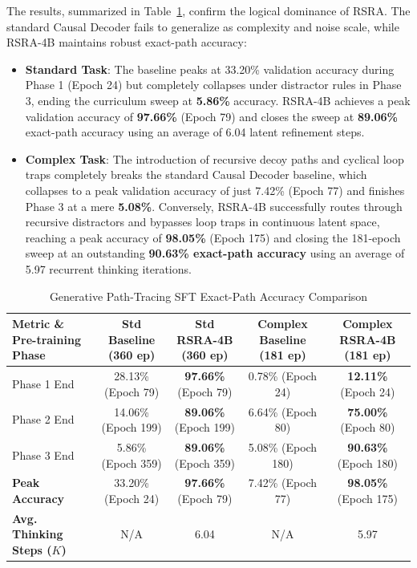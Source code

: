 \documentclass[11pt,a4paper]{article}
\theoremstyle{definition}
\begin{document}
The results, summarized in Table~\ref{tab:generative_results}, confirm the logical dominance of RSRA. The standard Causal Decoder fails to generalize as complexity and noise scale, while RSRA-4B maintains robust exact-path accuracy:
\begin{itemize}
    \item \textbf{Standard Task}: The baseline peaks at 33.20\% validation accuracy during Phase 1 (Epoch 24) but completely collapses under distractor rules in Phase 3, ending the curriculum sweep at \textbf{5.86\%} accuracy. RSRA-4B achieves a peak validation accuracy of \textbf{97.66\%} (Epoch 79) and closes the sweep at \textbf{89.06\%} exact-path accuracy using an average of 6.04 latent refinement steps.
    \item \textbf{Complex Task}: The introduction of recursive decoy paths and cyclical loop traps completely breaks the standard Causal Decoder baseline, which collapses to a peak validation accuracy of just 7.42\% (Epoch 77) and finishes Phase 3 at a mere \textbf{5.08\%}. Conversely, RSRA-4B successfully routes through recursive distractors and bypasses loop traps in continuous latent space, reaching a peak accuracy of \textbf{98.05\%} (Epoch 175) and closing the 181-epoch sweep at an outstanding \textbf{90.63\% exact-path accuracy} using an average of 5.97 recurrent thinking iterations.
\end{itemize}

\begin{table}[h]
\centering
\caption{Generative Path-Tracing SFT Exact-Path Accuracy Comparison}
\label{tab:generative_results}
\begin{tabular}{lcccc}
\toprule
Metric \& Pre-training Phase & Std Baseline (360 ep) & Std RSRA-4B (360 ep) & Complex Baseline (181 ep) & Complex RSRA-4B (181 ep) \\
\midrule
Phase 1 End & 28.13\% (Epoch 79) & \textbf{97.66\%} (Epoch 79) & 0.78\% (Epoch 24) & \textbf{12.11\%} (Epoch 24) \\
Phase 2 End & 14.06\% (Epoch 199) & \textbf{89.06\%} (Epoch 199) & 6.64\% (Epoch 80) & \textbf{75.00\%} (Epoch 80) \\
Phase 3 End & 5.86\% (Epoch 359) & \textbf{89.06\%} (Epoch 359) & 5.08\% (Epoch 180) & \textbf{90.63\%} (Epoch 180) \\
\midrule
\textbf{Peak Accuracy} & 33.20\% (Epoch 24) & \textbf{97.66\%} (Epoch 79) & 7.42\% (Epoch 77) & \textbf{98.05\%} (Epoch 175) \\
\textbf{Avg. Thinking Steps ($K$)} & N/A & 6.04 & N/A & 5.97 \\
\bottomrule
\end{tabular}
\end{table}
\end{document}
